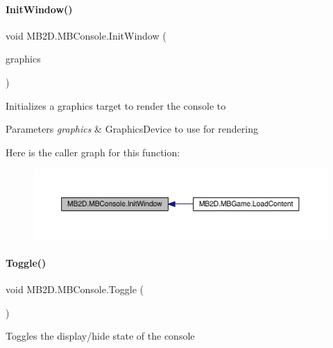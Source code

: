 \paragraph{\texorpdfstring{Init\+Window()}{InitWindow()}}
{\footnotesize\ttfamily void M\+B2\+D.\+M\+B\+Console.\+Init\+Window (\begin{DoxyParamCaption}\item[{Graphics\+Device}]{graphics }\end{DoxyParamCaption})\hspace{0.3cm}{\ttfamily [inline]}}



Initializes a graphics target to render the console to 


\begin{DoxyParams}{Parameters}
{\em graphics} & Graphics\+Device to use for rendering\\
\hline
\end{DoxyParams}
Here is the caller graph for this function\+:
\nopagebreak
\begin{figure}[H]
\begin{center}
\leavevmode
\includegraphics[width=350pt]{class_m_b2_d_1_1_m_b_console_a745ef1f55523b29b83d4d94c1fe5400b_icgraph}
\end{center}
\end{figure}
\hypertarget{class_m_b2_d_1_1_m_b_console_aab4c284a98afb148e35cf28e6d8ba0fc}{}\label{class_m_b2_d_1_1_m_b_console_aab4c284a98afb148e35cf28e6d8ba0fc} 
\paragraph{\texorpdfstring{Toggle()}{Toggle()}}
{\footnotesize\ttfamily void M\+B2\+D.\+M\+B\+Console.\+Toggle (\begin{DoxyParamCaption}{ }\end{DoxyParamCaption})\hspace{0.3cm}{\ttfamily [inline]}}



Toggles the display/hide state of the console 

